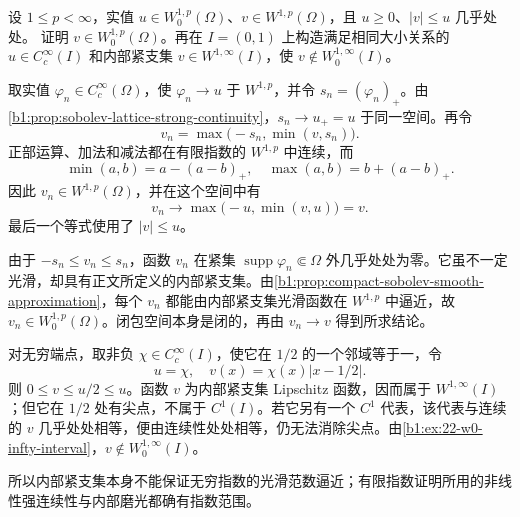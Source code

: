 \begin{exercise}\label{b1:ex:22-w0-order-ideal}
设 \(1\le p<\infty\)，实值 \(u\in W_0^{1,p}(\Omega)\)、\(v\in W^{1,p}(\Omega)\)，且 \(u\ge0\)、\(|v|\le u\) 几乎处处。
证明 \(v\in W_0^{1,p}(\Omega)\)。再在 \(I=(0,1)\) 上构造满足相同大小关系的 \(u\in C_c^\infty(I)\) 和内部紧支集 \(v\in W^{1,\infty}(I)\)，使 \(v\notin W_0^{1,\infty}(I)\)。
\end{exercise}
\begin{solution}
取实值 \(\varphi_n\in C_c^\infty(\Omega)\)，使 \(\varphi_n\to u\) 于 \(W^{1,p}\)，并令 \(s_n=(\varphi_n)_+\)。由\cref{b1:prop:sobolev-lattice-strong-continuity}，\(s_n\to u_+=u\) 于同一空间。再令
\[
 v_n=\max\bigl(-s_n,\min(v,s_n)\bigr).
\]
正部运算、加法和减法都在有限指数的 \(W^{1,p}\) 中连续，而
\[
 \min(a,b)=a-(a-b)_+,\quad
 \max(a,b)=b+(a-b)_+.
\]
因此 \(v_n\in W^{1,p}(\Omega)\)，并在这个空间中有
\[
 v_n\longrightarrow\max\bigl(-u,\min(v,u)\bigr)=v.
\]
最后一个等式使用了 \(|v|\le u\)。

由于 \(-s_n\le v_n\le s_n\)，函数 \(v_n\) 在紧集 \(\operatorname{supp}\varphi_n\Subset\Omega\) 外几乎处处为零。它虽不一定光滑，却具有正文所定义的内部紧支集。由\cref{b1:prop:compact-sobolev-smooth-approximation}，每个 \(v_n\) 都能由内部紧支集光滑函数在 \(W^{1,p}\) 中逼近，故 \(v_n\in W_0^{1,p}(\Omega)\)。闭包空间本身是闭的，再由 \(v_n\to v\) 得到所求结论。

对无穷端点，取非负 \(\chi\in C_c^\infty(I)\)，使它在 \(1/2\) 的一个邻域等于一，令
\[
 u=\chi,\quad v(x)=\chi(x)|x-1/2|.
\]
则 \(0\le v\le u/2\le u\)。函数 \(v\) 为内部紧支集 Lipschitz 函数，因而属于 \(W^{1,\infty}(I)\)；但它在 \(1/2\) 处有尖点，不属于 \(C^1(I)\)。若它另有一个 \(C^1\) 代表，该代表与连续的 \(v\) 几乎处处相等，便由连续性处处相等，仍无法消除尖点。由\cref{b1:ex:22-w0-infty-interval}，\(v\notin W_0^{1,\infty}(I)\)。

所以内部紧支集本身不能保证无穷指数的光滑范数逼近；有限指数证明所用的非线性强连续性与内部磨光都确有指数范围。
\end{solution}

